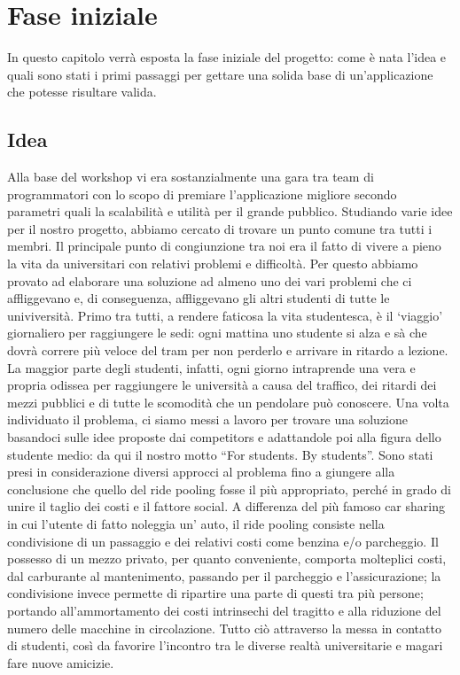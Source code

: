 \chapter{Fase iniziale}
In questo capitolo verrà esposta la fase iniziale del progetto: come è nata l'idea e quali sono stati i primi passaggi per gettare una solida base di un'applicazione che potesse risultare valida.

\section{Idea}
Alla base del workshop vi era sostanzialmente una gara tra team di programmatori con lo scopo di premiare l'applicazione migliore secondo parametri quali la scalabilità e utilità per il grande pubblico.
Studiando varie idee per il nostro progetto, abbiamo cercato di trovare un punto comune tra tutti i membri. Il principale punto di congiunzione tra noi era il fatto di vivere a pieno la vita da universitari con relativi problemi e difficoltà. Per questo abbiamo provato ad elaborare una soluzione ad almeno uno dei vari problemi che ci affliggevano e, di conseguenza, affliggevano gli altri studenti di tutte le univiversità.
Primo tra tutti, a rendere faticosa la vita studentesca, è il ‘viaggio’ giornaliero per raggiungere le sedi: ogni mattina uno studente si alza e sà che dovrà correre più veloce del tram per non perderlo e arrivare in ritardo a lezione. La maggior parte degli studenti, infatti, ogni giorno intraprende una vera e propria odissea per raggiungere le università a causa del traffico, dei ritardi dei mezzi pubblici e di tutte le scomodità che un pendolare può conoscere.
Una volta individuato il problema, ci siamo messi a lavoro per trovare una soluzione basandoci sulle idee proposte dai competitors e adattandole poi alla figura dello studente medio: da qui il nostro motto “For students. By students”.
Sono stati presi in considerazione diversi approcci al problema fino a giungere alla conclusione che quello del ride pooling fosse il più appropriato, perché in grado di unire il taglio dei costi e il fattore social.
A differenza del più famoso car sharing in cui l'utente di fatto noleggia un' auto, il ride pooling consiste nella condivisione di un passaggio e dei relativi costi come benzina e/o parcheggio.
Il possesso di un mezzo privato, per quanto conveniente, comporta molteplici costi, dal carburante al mantenimento, passando per il parcheggio e l’assicurazione; la condivisione invece permette di ripartire una parte di questi tra più persone; portando all’ammortamento dei costi intrinsechi del tragitto e alla riduzione del numero delle macchine in circolazione. Tutto ciò attraverso la messa in contatto di studenti, così da favorire l’incontro tra le diverse realtà universitarie e magari fare nuove amicizie.

